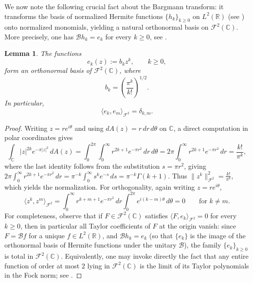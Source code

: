 \documentclass[a4paper,11pt,reqno]{amsart}
\numberwithin{equation}{section}
\theoremstyle{plain} %
\newtheorem{lemma}{Lemma}[section]
\theoremstyle{definition} %
\theoremstyle{remark}
\newcommand{\R}{\mathbb{R}}
\newcommand{\C}{\mathbb{C}}
\begin{document}
\medskip

We now note the following crucial fact about the Bargmann transform: it
transforms the basis of normalized Hermite functions \(\{h_k\}_{k\geq 0}\) on
\(L^2(\R)\) (see \cite{Thangavelu}) onto normalized monomials, yielding a
natural orthonormal basis on $\mathcal{F}^2(\C).$ More precisely, one has
\(\mathcal B h_k=e_k\) for every \(k\ge 0\), see \cite{Bargmann,Folland,Grochenig}.

\begin{lemma}\label{lem:monomials}
The functions
\[
e_k(z) := b_k z^k, \qquad k \ge 0,
\]
form an orthonormal basis of $\mathcal{F}^2(\mathbb{C})$, where
\[
b_k = \left( \frac{\pi^k}{k!} \right)^{1/2}.
\]
In particular,
\[
\langle e_k, e_m \rangle_{\mathcal{F}^2} = \delta_{k,m}.
\]
\end{lemma}

\begin{proof}
Writing \(z=re^{i\theta}\) and using \(dA(z)=r\,dr\,d\theta\) on \(\C\),
a direct computation in polar coordinates gives
\[
\int_{\mathbb{C}} |z|^{2k} e^{-\pi |z|^2}\,dA(z)
= \int_0^{2\pi}\!\!\int_0^\infty r^{2k+1} e^{-\pi r^2}\,dr\,d\theta
= 2\pi \int_0^\infty r^{2k+1} e^{-\pi r^2}\,dr
= \frac{k!}{\pi^k},
\]
where the last identity follows from the substitution \(s=\pi r^2\), giving
\(2\pi\int_0^\infty r^{2k+1}e^{-\pi r^2}\,dr=\pi^{-k}\int_0^\infty s^k e^{-s}\,ds
=\pi^{-k}\Gamma(k+1)\). Thus
\(\|z^k\|_{\mathcal{F}^2}^2 = \frac{k!}{\pi^k}\), which yields the normalization.
For orthogonality, again writing \(z=re^{i\theta}\),
\[
\langle z^k,z^m\rangle_{\mathcal F^2}
=
\int_0^\infty r^{k+m+1}e^{-\pi r^2}\,dr\int_0^{2\pi}e^{i(k-m)\theta}\,d\theta
=
0
\qquad\text{for }k\neq m.
\]
For completeness, observe that if \(F\in \mathcal F^2(\C)\) satisfies
\(\langle F,e_k\rangle_{\mathcal F^2}=0\) for every \(k\ge 0\), then in
particular all Taylor coefficients of \(F\) at the origin vanish: since
\(F=\mathcal Bf\) for a unique \(f\in L^2(\R)\), and \(\mathcal Bh_k=e_k\) (so
that \(\{e_k\}\) is the image of the orthonormal basis of Hermite functions
under the unitary \(\mathcal B\)), the family \(\{e_k\}_{k\ge 0}\) is total in
\(\mathcal F^2(\C)\). Equivalently, one may invoke directly the fact that any
entire function of order at most \(2\) lying in \(\mathcal F^2(\C)\) is the
limit of its Taylor polynomials in the Fock norm; see
\cite{Bargmann,Zhu}.
\end{proof}

\medskip
\end{document}
